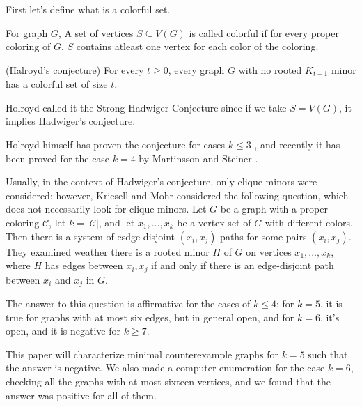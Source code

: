 First let's define what is a colorful set.

\begin{defn}
    For graph $G$, A set of vertices $S \subseteq V(G)$ is called colorful if for every proper coloring of $G$, $S$ contains atleast one 
    vertex for each color of the coloring.
\end{defn}

\begin{conj} (Halroyd's conjecture)
    For every $t \geq 0$, every graph $G$ with no rooted $K_{t+1}$ minor has a colorful set of size $t$.
\end{conj}

Holroyd called it the Strong Hadwiger Conjecture since if we take $S = V(G)$, it implies Hadwiger's conjecture.

Holroyd himself has proven the conjecture for cases $k \leq 3$ \cite{Holroyd1997}, and recently it has been proved for the case
$k = 4$ by Martinsson and Steiner \cite{MARTINSSON20241}.


Usually, in the context of Hadwiger's conjecture, only clique minors were considered; however, Kriesell and Mohr \cite{matthias_2022} considered
the following question, which does not necessarily look for clique minors. Let $G$ be a graph with a proper coloring
$\mathcal{C}$, let $k = |\mathcal{C}|$, and let $x_1, ..., x_{k}$ be a vertex set of $G$ with different colors.
Then there is a system of esdge-disjoint $(x_i, x_j)$-paths for some pairs $(x_i, x_j)$.
They examined weather there is a rooted minor $H$ of $G$ on vertices $x_1, ..., x_{k}$, where $H$ has edges between 
$x_i, x_j$ if and only if there is an edge-disjoint path between $x_i$ and $x_j$ in $G$.

The answer to this question is affirmative for the cases of $k \leq 4$; for $k = 5$, it is true for graphs
with at most six edges, but in general open, and for $k = 6$, it's open, and it is negative for $k \geq 7$.

This paper will characterize minimal counterexample graphs for $k = 5$ such that the answer is negative. 
We also made a computer enumeration for the case $k = 6$, checking all the graphs with at most sixteen vertices, and 
we found that the answer was positive for all of them.

